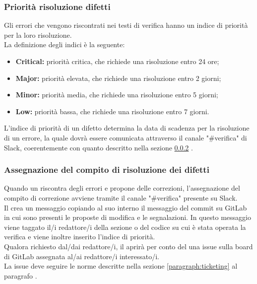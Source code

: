 \subsubsection{Priorità risoluzione difetti}\label{paragraph:priorita_anomalie}
Gli errori che vengono riscontrati nei testi di verifica hanno un indice di priorità per la loro risoluzione.\\
La definizione degli indici è la seguente:
\begin{itemize}
	\item \textbf{Critical:} priorità critica, che richiede una risoluzione entro 24 ore;
	\item \textbf{Major:} priorità elevata, che richiede una risoluzione entro 2 giorni;
	\item \textbf{Minor:} priorità media, che richiede una risoluzione entro 5 giorni;
	\item \textbf{Low:} priorità bassa, che richiede una risoluzione entro 7 giorni.
\end{itemize}
L'indice di priorità di un difetto determina la data di scadenza per la risoluzione di un errore, la quale dovrà essere comunicata attraverso il canale "\#verifica" di Slack, coerentemente con quanto descritto nella sezione \ref{paragraph:assegnazione_anomalie} .

\subsubsection{Assegnazione del compito di risoluzione dei difetti}\label{paragraph:assegnazione_anomalie}
Quando un \roleVerifier{} riscontra degli errori e propone delle correzioni, l'assegnazione del compito di correzione avviene tramite il canale "\#verifica" presente su Slack.\\
Il \roleVerifier{} crea un messaggio copiando al suo interno il messaggio del commit su GitLab in cui sono presenti le proposte di modifica e le segnalazioni. In questo messaggio viene taggato il/i redattore/i della sezione o del codice su cui è stata operata la verifica e viene inoltre inserito l'indice di priorità.\\
Qualora richiesto dal/dai redattore/i, il \roleVerifier{} aprirà per conto del \roleProjectManager{} una issue sulla board di GitLab assegnata al/ai redattore/i interessato/i.\\
La issue deve seguire le norme descritte nella sezione \ref{paragraph:ticketing} al paragrafo .

